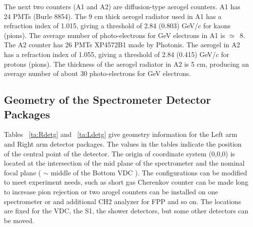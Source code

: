 The next two counters (A1 and A2) are diffusion-type aerogel 
counters. A1 has 24 PMTs (Burle 8854). 
The 9 cm thick aerogel radiator used in A1 has a refraction index of 1.015, 
giving a threshold of 2.84 (0.803) GeV/$c$ for kaons (pions). 
The average number of photo-electrons for GeV electrons 
in A1 is $\simeq$~8. The A2 counter has 26 PMTs XP4572B1 made by Photonis. 
The aerogel in A2 has a refraction index of 1.055, 
giving a threshold of 2.84 (0.415) GeV/$c$ for protons (pions). 
The thickness of the aerogel radiator in A2 is 5 cm, producing an average 
number of about 30 photo-electrons for GeV electrons.

\subsection{Geometry of the Spectrometer Detector Packages}

Tables ~\ref{ta:Rdetg} and ~\ref{ta:Ldetg} give geometry
information for the Left arm and Right arm detector packages. 
The values in the tables
indicate the position of the central point of the detector.
The origin of coordinate system (0,0,0) is located at the intersection of 
the mid plane of the spectrometer and the nominal focal
plane ( $\sim$ middle of the Bottom VDC ).
The configurations can be modified to meet experiment needs, such
as short gas Cherenkov counter can be made long to increase pion
rejection or two arogel counters can be installed on one spectrometer
or and additional CH2 analyzer for FPP and so on. The locations are
fixed for the VDC, the S1, the shower detectors, but some other detectors 
can be moved.

